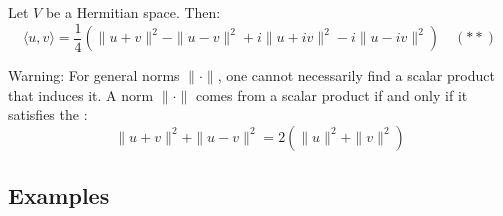 \begin{exercise}
Let $V$ be a Hermitian space. Then:
\[
    \langle u, v \rangle = \frac{1}{4}\left(\|u+v\|^2 - \|u-v\|^2 + i\|u+iv\|^2 - i\|u-iv\|^2\right) \quad (**)
\]
\end{exercise}

\begin{importantremark}
\label{rem:parallelogram_law}
Warning: For general norms $\|\cdot\|$, one cannot necessarily find a scalar product that induces it. A norm $\|\cdot\|$ comes from a scalar product if and only if it satisfies the :
\[
    \|u+v\|^2 + \|u-v\|^2 = 2\left(\|u\|^2 + \|v\|^2\right)
\]
\end{importantremark}

\subsection{Examples}


